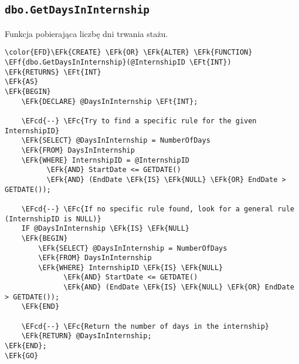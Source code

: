 \documentclass[11pt]{article}
\newcommand{\EFc}[1]{\textcolor{EFc}{\textit{#1}}} %
\newcommand{\EFcd}[1]{\textcolor{EFcd}{\textit{#1}}} %
\newcommand{\EFk}[1]{\textcolor{EFk}{\textbf{#1}}} %
\newcommand{\EFf}[1]{\textcolor{EFf}{#1}} %
\newcommand{\EFt}[1]{\textcolor{EFt}{\textbf{#1}}} %
\begin{document}
\subsection{\texttt{dbo.GetDaysInInternship}}
\label{sec:org32953c6}
Funkcja pobierająca liczbę dni trwania stażu.
\begin{Code}
\begin{Verbatim}
\color{EFD}\EFk{CREATE} \EFk{OR} \EFk{ALTER} \EFk{FUNCTION} \EFf{dbo.GetDaysInInternship}(@InternshipID \EFt{INT})
\EFk{RETURNS} \EFt{INT}
\EFk{AS}
\EFk{BEGIN}
    \EFk{DECLARE} @DaysInInternship \EFt{INT};

    \EFcd{--} \EFc{Try to find a specific rule for the given InternshipID}
    \EFk{SELECT} @DaysInInternship = NumberOfDays
    \EFk{FROM} DaysInInternship
    \EFk{WHERE} InternshipID = @InternshipID
          \EFk{AND} StartDate <= GETDATE()
          \EFk{AND} (EndDate \EFk{IS} \EFk{NULL} \EFk{OR} EndDate > GETDATE());

    \EFcd{--} \EFc{If no specific rule found, look for a general rule (InternshipID is NULL)}
    IF @DaysInInternship \EFk{IS} \EFk{NULL}
    \EFk{BEGIN}
        \EFk{SELECT} @DaysInInternship = NumberOfDays
        \EFk{FROM} DaysInInternship
        \EFk{WHERE} InternshipID \EFk{IS} \EFk{NULL}
              \EFk{AND} StartDate <= GETDATE()
              \EFk{AND} (EndDate \EFk{IS} \EFk{NULL} \EFk{OR} EndDate > GETDATE());
    \EFk{END}

    \EFcd{--} \EFc{Return the number of days in the internship}
    \EFk{RETURN} @DaysInInternship;
\EFk{END};
\EFk{GO}
\end{Verbatim}
\end{Code}
\end{document}
